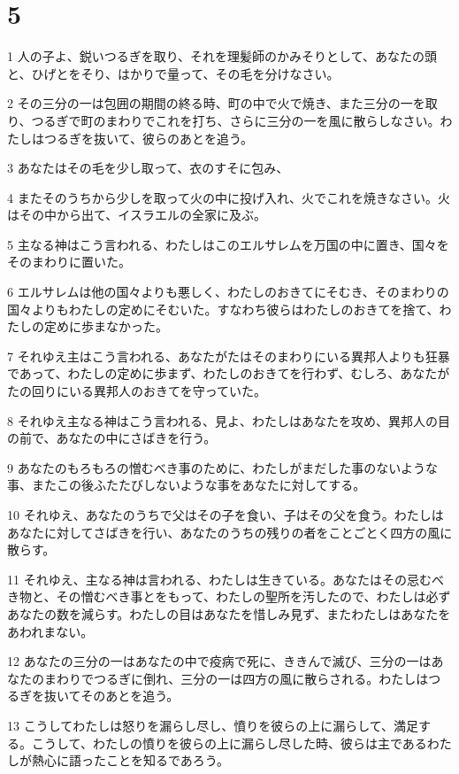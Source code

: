 \chapter{5}

\par 1 人の子よ、鋭いつるぎを取り、それを理髪師のかみそりとして、あなたの頭と、ひげとをそり、はかりで量って、その毛を分けなさい。
\par 2 その三分の一は包囲の期間の終る時、町の中で火で焼き、また三分の一を取り、つるぎで町のまわりでこれを打ち、さらに三分の一を風に散らしなさい。わたしはつるぎを抜いて、彼らのあとを追う。
\par 3 あなたはその毛を少し取って、衣のすそに包み、
\par 4 またそのうちから少しを取って火の中に投げ入れ、火でこれを焼きなさい。火はその中から出て、イスラエルの全家に及ぶ。
\par 5 主なる神はこう言われる、わたしはこのエルサレムを万国の中に置き、国々をそのまわりに置いた。
\par 6 エルサレムは他の国々よりも悪しく、わたしのおきてにそむき、そのまわりの国々よりもわたしの定めにそむいた。すなわち彼らはわたしのおきてを捨て、わたしの定めに歩まなかった。
\par 7 それゆえ主はこう言われる、あなたがたはそのまわりにいる異邦人よりも狂暴であって、わたしの定めに歩まず、わたしのおきてを行わず、むしろ、あなたがたの回りにいる異邦人のおきてを守っていた。
\par 8 それゆえ主なる神はこう言われる、見よ、わたしはあなたを攻め、異邦人の目の前で、あなたの中にさばきを行う。
\par 9 あなたのもろもろの憎むべき事のために、わたしがまだした事のないような事、またこの後ふたたびしないような事をあなたに対してする。
\par 10 それゆえ、あなたのうちで父はその子を食い、子はその父を食う。わたしはあなたに対してさばきを行い、あなたのうちの残りの者をことごとく四方の風に散らす。
\par 11 それゆえ、主なる神は言われる、わたしは生きている。あなたはその忌むべき物と、その憎むべき事とをもって、わたしの聖所を汚したので、わたしは必ずあなたの数を減らす。わたしの目はあなたを惜しみ見ず、またわたしはあなたをあわれまない。
\par 12 あなたの三分の一はあなたの中で疫病で死に、ききんで滅び、三分の一はあなたのまわりでつるぎに倒れ、三分の一は四方の風に散らされる。わたしはつるぎを抜いてそのあとを追う。
\par 13 こうしてわたしは怒りを漏らし尽し、憤りを彼らの上に漏らして、満足する。こうして、わたしの憤りを彼らの上に漏らし尽した時、彼らは主であるわたしが熱心に語ったことを知るであろう。
